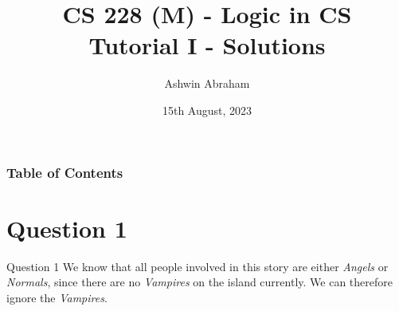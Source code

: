 \documentclass{beamer}
\title[] 
{\textbf{CS 228 (M) - Logic in CS}\\Tutorial I - Solutions}
\author[Ashwin Abraham] 
{Ashwin Abraham}
\institute[] 
{
    IIT Bombay
}
\date[2023]
{15th August, 2023}
\begin{document}
    \frame{\titlepage}

    \begin{frame}
        \frametitle{Table of Contents}
        \tableofcontents    
    \end{frame}

    \section{Question 1}
    {
    

        \begin{frame}{Question 1}
            We know that all people involved in this story are either \textit{Angels} or \textit{Normals}, since there are no \textit{Vampires} on the island currently. We can therefore ignore the \textit{Vampires}.


\end{frame}}
\end{document}

